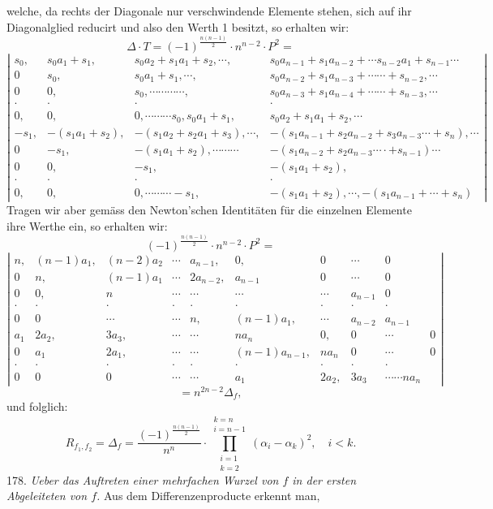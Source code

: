 welche, da rechts der Diagonale nur verschwindende Elemente stehen, sich auf ihr Diagonalglied reducirt und also den Werth 1 besitzt, so erhalten wir:
\[
\Delta \cdot T = (-1)^{\frac{n(n-1)}{2}} \cdot n^{n-2} \cdot P^2 =
\]
\[
\left|
\begin{array}{ccccc}
s_0, & s_0a_1+s_1, & s_0a_2+s_1a_1+s_2,\cdots, & s_0a_{n-1}+s_1a_{n-2}+\cdots s_{n-2}a_1+s_{n-1}\cdots \\
0 & s_0, & s_0a_1+s_1, \cdots, & s_0a_{n-2}+s_1a_{n-3}+\cdots\cdots+s_{n-2},\cdots \\
0 & 0, & s_0,\cdots\cdots\cdots\cdots, & s_0a_{n-3}+s_1a_{n-4}+\cdots\cdots+s_{n-3},\cdots \\
\cdot & \cdot & \cdot & \cdot \\
0, & 0, & 0,\cdots\cdots\cdots s_0, s_0a_1+s_1, & s_0a_2+s_1a_1+s_2,\cdots \\
-s_1, & -(s_1a_1+s_2), & -(s_1a_2+s_2a_1+s_3),\cdots, & -(s_1a_{n-1}+s_2a_{n-2}+s_3a_{n-3}\cdots+s_n),\cdots \\
0 & -s_1, & -(s_1a_1+s_2), \cdots\cdots\cdots & -(s_1a_{n-2}+s_2a_{n-3}\cdots\cdot+s_{n-1})\cdots \\
0 & 0, & -s_1, & -(s_1a_1+s_2), \\
\cdot & \cdot & \cdot & \cdot \\
0, & 0, & 0,\cdots\cdots\cdots-s_1, & -(s_1a_1+s_2),\cdots, -(s_1a_{n-1}+\cdots+s_n)
\end{array}
\right|
\]
Tragen wir aber gemäss den Newton'schen Identitäten für die einzelnen Elemente ihre Werthe ein, so erhalten wir:
\[
(-1)^{\frac{n(n-1)}{2}} \cdot n^{n-2} \cdot P^2 =
\]
\[
\left|
\begin{array}{cccccccccc}
n, & (n-1)a_1, & (n-2)a_2 & \cdots & a_{n-1}, & 0, & 0 & \cdots & 0 \\
0 & n, & (n-1)a_1 & \cdots & 2a_{n-2}, & a_{n-1} & 0 & \cdots & 0 \\
0 & 0, & n & \cdots & \cdots & \cdots & \cdots & a_{n-1} & 0 \\
\cdot & \cdot & \cdot & \cdot & \cdot & \cdot & \cdot & \cdot & \cdot \\
0 & 0 & \cdots & \cdots & n, & (n-1)a_1, & \cdots & a_{n-2} & a_{n-1} \\
a_1 & 2a_2, & 3a_3, & \cdots & \cdots & na_n & 0, & 0 & \cdots & 0 \\
0 & a_1 & 2a_1, & \cdots & \cdots & (n-1)a_{n-1}, & na_n & 0 & \cdots & 0 \\ %
\cdot & \cdot & \cdot & \cdot & \cdot & \cdot & \cdot & \cdot & \cdot \\
0 & 0 & 0 & \cdots & \cdots & a_1 & 2a_2, & 3a_3 & \cdots \cdots na_n
\end{array}
\right|
\]
\[
= n^{2n-2} \Delta_f,
\]
und folglich:
\[
R_{f_1,f_2} = \Delta_f = \dfrac{(-1)^{\frac{n(n-1)}{2}}}{n^n} \cdot \prod_{\substack{i=1 \\ k=2}}^{\substack{k=n \\ i=n-1}} (\alpha_i - \alpha_k)^2, \quad i<k.
\]
178. \textit{Ueber das Auftreten einer mehrfachen Wurzel von $f$ in der ersten Abgeleiteten von $f$.} Aus dem Differenzenproducte erkennt man,


